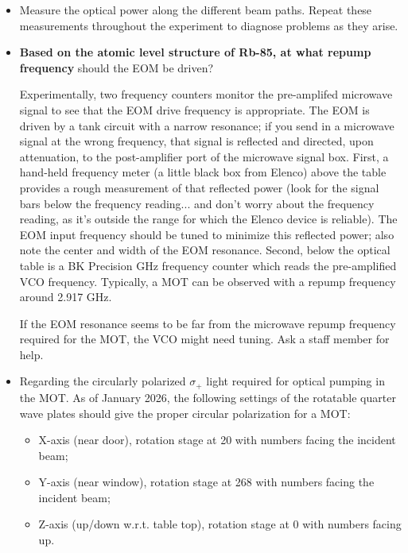\documentclass{../lab}
\begin{document}
\begin{itemize}
    \item Measure the optical power along the different beam paths. Repeat these measurements throughout the experiment to diagnose problems as they arise.

    \item \textbf{Based on the atomic level structure of Rb-85, at what repump frequency} should the EOM be driven? 
    
    Experimentally, two frequency counters monitor the pre-amplifed microwave signal to see that the EOM drive frequency is appropriate. The EOM is driven by a tank circuit with a narrow resonance; if you send in a microwave signal at the wrong frequency, that signal is reflected and directed, upon attenuation, to the post-amplifier port of the microwave signal box. First, a hand-held frequency meter (a little black box from Elenco) above the table provides a rough measurement of that reflected power (look for the signal bars below the frequency reading... and don't worry about the frequency reading, as it's outside the range for which the Elenco device is reliable). The EOM input frequency should be tuned to minimize this reflected power; also note the center and width of the EOM resonance. Second, below the optical table is a BK Precision GHz frequency counter which reads the pre-amplified VCO frequency. Typically, a MOT can be observed with a repump frequency around 2.917 GHz. 
    
    If the EOM resonance seems to be far from the microwave repump frequency required for the MOT, the VCO might need tuning. Ask a staff member for help.

    \item Regarding the circularly polarized $\sigma_+$ light required for optical pumping in the MOT. As of January 2026, the following settings of the rotatable quarter wave plates should give the proper circular polarization for a MOT:
    \begin{itemize}
        \item X-axis (near door), rotation stage at 20 with numbers facing the incident beam;
        \item Y-axis (near window), rotation stage at 268 with numbers facing the incident beam; 
        \item Z-axis (up/down w.r.t. table top), rotation stage at 0 with numbers facing up.
    \end{itemize}
\end{itemize}
\end{document}
